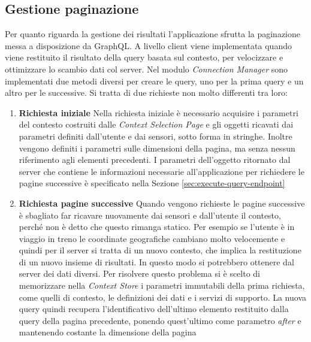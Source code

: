 \subsection{Gestione paginazione}\label{sec:paginazione-app}

Per quanto riguarda la gestione dei risultati l'applicazione sfrutta la paginazione messa a disposizione da GraphQL. A livello client viene implementata quando viene restituito il risultato della query basata sul contesto, per velocizzare e ottimizzare lo scambio dati col server. Nel modulo \emph{Connection Manager} sono implementati due metodi diversi per creare le query, uno per la prima query e un altro per le successive. Si tratta di due richieste non molto differenti tra loro:

\begin{enumerate}
	\item \textbf{Richiesta iniziale}
	Nella richiesta iniziale è necessario acquisire i parametri del contesto costruiti dalle \emph{Context Selection Page} e gli oggetti ricavati dai parametri definiti dall'utente e dai sensori, sotto forma in stringhe. Inoltre vengono definiti i parametri sulle dimensioni della pagina, ma senza nessun riferimento agli elementi precedenti.
	I parametri dell'oggetto ritornato dal server che contiene le informazioni necessarie all'applicazione per richiedere le pagine successive è specificato nella Sezione \ref{sec:execute-query-endpoint}
	\item \textbf{Richiesta pagine successive}
	Quando vengono richieste le pagine successive è sbagliato far ricavare nuovamente dai sensori e dall'utente il contesto, perché non è detto che questo rimanga statico. Per esempio se l'utente è in viaggio in treno le coordinate geografiche cambiano molto velocemente e quindi per il server si tratta di un nuovo contesto, che implica la restituzione di un nuovo insieme di risultati. In questo modo si potrebbero ottenere dal server dei dati diversi. Per risolvere questo problema si è scelto di memorizzare nella \emph{Context Store} i parametri immutabili della prima richiesta, come quelli di contesto, le definizioni dei dati e i servizi di supporto. La nuova query quindi recupera l'identificativo dell'ultimo elemento restituito dalla query della pagina precedente, ponendo quest'ultimo come parametro \emph{after} e mantenendo costante la dimensione della pagina
\end{enumerate} 

